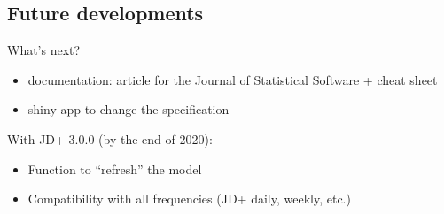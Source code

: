 \documentclass[10pt,xcolor=table,color={dvipsnames,usenames},ignorenonframetext,usepdftitle=false,french]{beamer}
\begin{document}
\hypertarget{future-developments}{%
\subsection{Future developments}\label{future-developments}}

\begin{frame}{What's next? \bcpanchant}
\protect\hypertarget{whats-next}{}

\begin{itemize}
\item
  documentation: article for the Journal of Statistical Software + cheat
  sheet
\item
  shiny app to change the specification
\end{itemize}

With JD+ 3.0.0 (by the end of 2020):

\begin{itemize}
\item
  Function to ``refresh'' the model
\item
  Compatibility with all frequencies (JD+ daily, weekly, etc.)
\end{itemize}

\end{frame}
\end{document}
